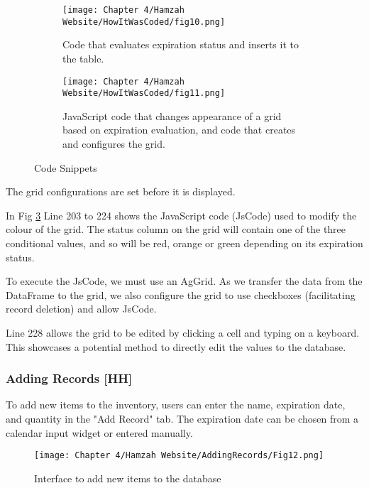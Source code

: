 \begin{figure}[H]
    \begin{subfigure}{.5\textwidth}
        \centering
        \texttt{[image: Chapter 4/Hamzah Website/HowItWasCoded/fig10.png]}
        \caption{Code that evaluates expiration status and inserts it to the table.}
        \label{fig:awefulcode}
    \end{subfigure}%
    \begin{subfigure}{.5\textwidth}
        \centering
        \texttt{[image: Chapter 4/Hamzah Website/HowItWasCoded/fig11.png]}
        \caption{JavaScript code that changes appearance of a grid based on expiration evaluation, and code that creates and configures the grid.}
        \label{fig:badcode}
    \end{subfigure}
    \caption{Code Snippets}
\end{figure}

The grid configurations are set before it is displayed.

In Fig \ref{fig:badcode} Line 203 to 224 shows the JavaScript code (JsCode) used to modify the colour of the grid.
The status column on the grid will contain one of the three conditional values, and so will be red, orange or green depending on its expiration status.

To execute the JsCode, we must use an AgGrid.
As we transfer the data from the DataFrame to the grid, we also configure the grid to use checkboxes (facilitating record deletion) and allow JsCode.

Line 228 allows the grid to be edited by clicking a cell and typing on a keyboard.
This showcases a potential method to directly edit the values to the database.

\subsubsection{Adding Records [HH]}

To add new items to the inventory, users can enter the name, expiration date, and quantity in the "Add Record" tab.
The expiration date can be chosen from a calendar input widget or entered manually.

\begin{figure}[H]        
    \centering
    \texttt{[image: Chapter 4/Hamzah Website/AddingRecords/Fig12.png]}
    \caption{Interface to add new items to the database}
\end{figure} 

